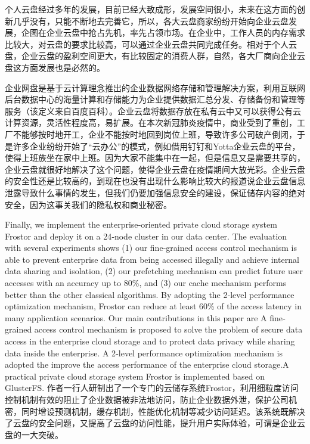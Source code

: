\documentclass{article}
\begin{document}
\begin{itemize}
    个人云盘经过多年的发展，目前已经大致成形，发展空间很小，未来在这方面的创新几乎没有，只能不断地去完善它，所以，各大云盘商家纷纷开始向企业云盘发展，企图在企业云盘中抢占先机，率先占领市场。在企业中，工作人员的内存需求比较大，对云盘的要求比较高，可以通过企业云盘共同完成任务。相对于个人云盘，企业云盘的盈利空间更大，有比较固定的消费人群，自然，各大厂商向企业云盘这方面发展也是必然的。\par
    企业网盘是基于云计算理念推出的企业数据网络存储和管理解决方案，利用互联网后台数据中心的海量计算和存储能力为企业提供数据汇总分发、存储备份和管理等服务（该定义来自百度百科）。企业云盘将数据存放在私有云中又可以获得公有云计算资源，灵活性程度高，易扩展。在本次新冠肺炎疫情中，商业受到了重创，工厂不能够按时地开工，企业不能按时地回到岗位上班，导致许多公司破产倒闭，于是许多企业纷纷开始了“云办公”的模式，例如借用钉钉和Yotta企业云盘的平台，使得上班族坐在家中上班。因为大家不能集中在一起，但是信息又是需要共享的，企业云盘就很好地解决了这个问题，使得企业云盘在疫情期间大放光彩。企业云盘的安全性还是比较高的，到现在也没有出现什么影响比较大的报道说企业云盘信息泄露导致什么事情的发生，但我们仍要加强信息安全的建设，保证储存内容的绝对安全，因为这事关我们的隐私权和商业秘密。\par
    Finally, we implement the enterprise‐oriented private cloud storage system Frostor and deploy it on a 24‐node cluster in our data center. The evaluation with several experiments shows (1) our fine‐grained access control mechanism is able to prevent enterprise data from being accessed illegally and achieve internal data sharing and isolation, (2) our prefetching mechanism can predict future user accesses with an accuracy up to 80\%, and (3) our cache mechanism performs better than the other classical algorithms. By adopting the 2‐level performance optimization mechanism, Frostor can reduce at least 60\% of the access latency in many application scenarios. Our main contributions in this paper are A fine‐grained access control mechanism is proposed to solve the problem of secure data access in the enterprise cloud storage and to protect data privacy while sharing data inside the enterprise. A 2‐level performance optimization mechanism is adopted the improve the access performance of the enterprise cloud storage.A practical private cloud storage system Frostor is implemented based on GlusterFS. \cite{qiye}
    作者一行人研制出了一个专门的云储存系统Frostor，利用细粒度访问控制机制有效的阻止了企业数据被非法地访问，防止企业数据外泄，保护公司机密，同时增设预测机制，缓存机制，性能优化机制等减少访问延迟。该系统既解决了云盘的安全问题，又提高了云盘的访问性能，提升用户实际体验，可谓是企业云盘的一大突破。\par
    
\end{itemize}
\end{document}
